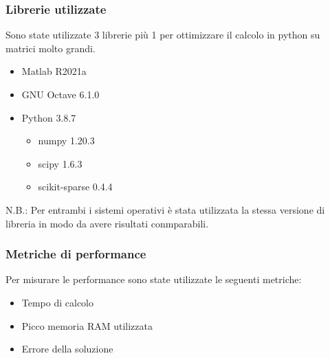\documentclass{beamer}
\begin{document}
\begin{frame}
	
	\frametitle{Librerie utilizzate}
	Sono state utilizzate 3 librerie più 1 per ottimizzare il calcolo in python su matrici molto grandi.
	\begin{itemize}
		\item Matlab  R2021a
		\item GNU Octave 6.1.0
		\item Python 3.8.7
		\begin{itemize}
			\item numpy 1.20.3
			\item scipy 1.6.3
			\item scikit-sparse 0.4.4
		\end{itemize}
	\end{itemize}
	N.B.: Per entrambi i sistemi operativi è stata utilizzata la stessa versione di libreria in modo da avere risultati conmparabili.
\end{frame}


\begin{frame}
	\frametitle{Metriche di performance}
	Per misurare le performance sono state utilizzate le seguenti metriche:
	\begin{itemize}
		\item Tempo di calcolo
		\item Picco memoria RAM utilizzata
		\item Errore della soluzione
	\end{itemize}
\end{frame}
\end{document}
